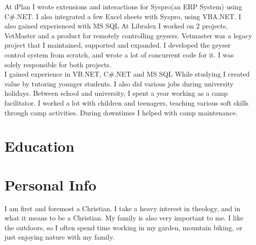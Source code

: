 \documentclass[a4paper]{twentysecondcv} %
\begin{document}
\begin{twenty}
    {At iPlan I wrote extensions and interactions for Syspro(an ERP System) using C\#.NET. I also integrated a few Excel sheets with Syspro, using VBA.NET. I also gained experienced with MS SQL}
    {At Libralex I worked on 2 projects, VetMaster and a product for remotely controlling geysers. Vetmaster was a legacy project that I maintained, supported and expanded. I developed the geyser control system from scratch, and wrote a lot of concurrent code for it. I was solely responsible for both projects.\\
    I gained experience in VB.NET, C\#.NET and MS SQL}
    {While studying I created value by tutoring younger students. I also did various jobs during university holidays.}
    {Between school and university, I spent a year working as a camp facilitator. I worked a lot with children and teenagers, teaching various soft skills through camp activities. During downtimes I helped with camp maintenance.}
\end{twenty}

\newpage %

\makeprofile %


\section{Education}

\begin{twenty} %

\end{twenty}

\section{Personal Info}

I am first and foremost a Christian. I take a heavy interest in theology, and in what it means to be a Christian.
My family is also very important to me.
I like the outdoors, so I often spend time working in my garden, mountain biking, or just enjoying nature with my family.
\end{document}
